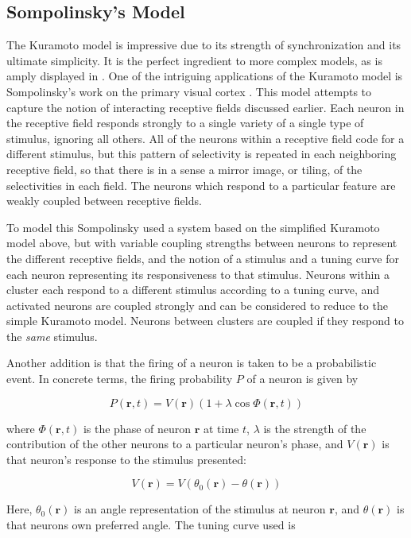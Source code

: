 \documentclass[12pt]{article}
\begin{document}
\subsection{Sompolinsky's Model}

The Kuramoto model is impressive due to its strength of synchronization and its ultimate simplicity.  It is the perfect ingredient to more complex models, as is amply displayed in \cite{Acebrón}.  One of the intriguing applications of the Kuramoto model is Sompolinsky's work on the primary visual cortex \cite{Sompolinsky}.  This model attempts to capture the notion of interacting receptive fields discussed earlier.  Each neuron in the receptive field responds strongly to a single variety of a single type of stimulus, ignoring all others.  All of the neurons within a receptive field code for a different stimulus, but this pattern of selectivity is repeated in each neighboring receptive field, so that there is in a sense a mirror image, or tiling, of the selectivities in each field.  The neurons which respond to a particular feature are weakly coupled between receptive fields.  

To model this Sompolinsky used a system based on the simplified Kuramoto model above, but with variable coupling strengths between neurons to represent the different receptive fields, and the notion of a stimulus and a tuning curve for each neuron representing its responsiveness to that stimulus.  Neurons within a cluster each respond to a different stimulus according to a tuning curve, and activated neurons are coupled strongly and can be considered to reduce to the simple Kuramoto model.  Neurons between clusters are coupled if they respond to the {\em same} stimulus.  

Another addition is that the firing of a neuron is taken to be a probabilistic event.  In concrete terms, the firing probability $P$ of a neuron is given by 

$$ P(\mathbf{r},t)=V(\mathbf{r})(1+\lambda\cos\Phi(\mathbf{r},t)) $$

where $\Phi(\mathbf{r},t)$ is the phase of neuron $\mathbf{r}$ at time $t$, $\lambda$ is the strength of the contribution of the other neurons to a particular neuron's phase, and $V(\mathbf{r})$ is that neuron's response to the stimulus presented:

$$ V(\mathbf{r})=V(\theta_0(\mathbf{r})-\theta(\mathbf{r})) $$

Here, $\theta_0(\mathbf{r})$ is an angle representation of the stimulus at neuron $\mathbf{r}$, and $\theta(\mathbf{r})$ is that neurons own preferred angle.  The tuning curve used is 
\end{document}
